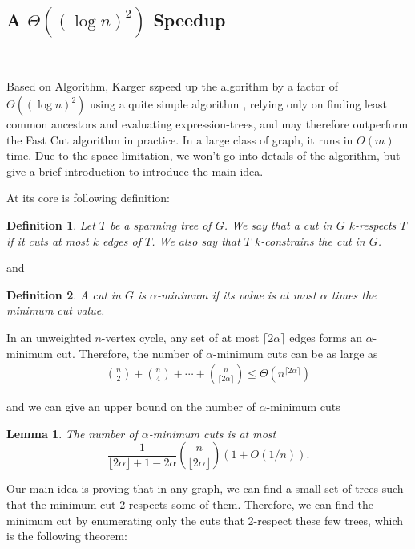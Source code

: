 \documentclass[11pt]{article}
\theoremstyle{plain}
\newtheorem{lemma}{Lemma}[section]
\newtheorem{definition}{Definition}[section]
\begin{document}
\subsection{A \texorpdfstring{$\Theta((\log n)^2)$}{ } Speedup}\

Based on Algorithm, Karger szpeed up the algorithm by a factor of $\Theta((\log n)^2)$ using a quite simple algorithm \cite{karger2000minimum}, relying only on finding least common ancestors and evaluating expression-trees, and may
therefore outperform the Fast Cut algorithm in practice. In a large class of graph, it runs in $O(m)$ time. Due to the space limitation, we won't go into details of the algorithm, but give a brief introduction to introduce the main idea.

At its core is following definition:

\begin{definition}
    Let $T$ be a spanning tree of $G$. We say that a cut in $G$ $k$-respects $T$ if it cuts at most $k$ edges of $T$. We also say that $T$ $k$-constrains the cut in $G$.
\end{definition}

and 

\begin{definition}
    A cut in $G$ is $\alpha$-minimum if its value is at most
    $\alpha$ times the minimum cut value.
\end{definition}

In an unweighted $n$-vertex cycle, any set of at most $\lceil 2\alpha\rceil$ edges forms an $\alpha$-minimum cut. Therefore, the number of $\alpha$-minimum cuts can be as large as
\begin{align*}
    \binom{n}{2}+\binom{n}{4}+\cdots+\binom{n}{\lceil 2\alpha\rceil}\leq \Theta(n^{\lceil 2\alpha\rceil})
\end{align*}

and we can give an upper bound on the number of $\alpha$-minimum cuts

\begin{lemma}
    The number of $\alpha$-minimum cuts is at most
  \[
  \frac{1}{\lfloor 2\alpha \rfloor + 1 -2\alpha} \binom{n}{\lfloor
      2\alpha \rfloor}(1+O(1/n)).
  \]
\end{lemma} 

Our main idea is proving that in any graph, we can find a small set of trees such that the minimum cut 2-respects some of them. Therefore, we can find the minimum cut by enumerating only the cuts that 2-respect these few trees, which is the following theorem:
\end{document}
